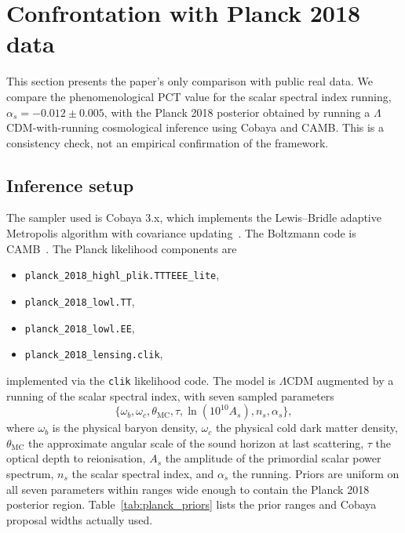 ﻿\documentclass[12pt,a4paper]{article}
\theoremstyle{definition}
\begin{document}
\section{Confrontation with Planck 2018 data}
\label{sec:planck}

This section presents the paper's only comparison with public real data. We compare the phenomenological PCT value for the scalar spectral index running, $\alpha_s = -0.012 \pm 0.005$, with the Planck 2018 posterior obtained by running a $\Lambda$CDM-with-running cosmological inference using Cobaya and CAMB. This is a consistency check, not an empirical confirmation of the framework.

\subsection{Inference setup}
\label{sec:planck_setup}

The sampler used is Cobaya 3.x, which implements the Lewis--Bridle adaptive Metropolis algorithm with covariance updating~\citep{cobaya}. The Boltzmann code is CAMB~\citep{lewis_camb}. The Planck likelihood components are
\begin{itemize}
  \item \texttt{planck\_2018\_highl\_plik.TTTEEE\_lite},
  \item \texttt{planck\_2018\_lowl.TT},
  \item \texttt{planck\_2018\_lowl.EE},
  \item \texttt{planck\_2018\_lensing.clik},
\end{itemize}
implemented via the \texttt{clik} likelihood code. The model is $\Lambda$CDM augmented by a running of the scalar spectral index, with seven sampled parameters
\[
\{\omega_b, \omega_c, \theta_{\mathrm{MC}}, \tau, \ln(10^{10} A_s), n_s, \alpha_s\},
\]
where $\omega_b$ is the physical baryon density, $\omega_c$ the physical cold dark matter density, $\theta_{\mathrm{MC}}$ the approximate angular scale of the sound horizon at last scattering, $\tau$ the optical depth to reionisation, $A_s$ the amplitude of the primordial scalar power spectrum, $n_s$ the scalar spectral index, and $\alpha_s$ the running. Priors are uniform on all seven parameters within ranges wide enough to contain the Planck 2018 posterior region. Table~\ref{tab:planck_priors} lists the prior ranges and Cobaya proposal widths actually used.
\end{document}
